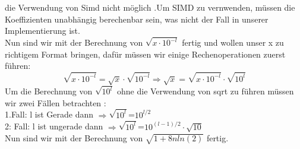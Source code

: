 \documentclass[course=erap]{aspdoc}
\begin{document}
die Verwendung von Simd  nicht möglich .Um SIMD zu vernwenden, müssen die Koeffizienten unabhängig berechenbar sein, was nicht der Fall in unserer Implementierung ist.
\\ Nun sind wir mit der Berechnung von $\sqrt{x\cdot 10^{-l}}$ fertig und wollen unser x
zu richtigem Format bringen, dafür müssen wir einige Rechenoperationen zuerst führen:
\begin{equation}\label{eq8}
    \sqrt{x\cdot 10^{-l}}  = \sqrt{x} \cdot \sqrt{10^{-l}}
    \Longrightarrow \sqrt{x}=\sqrt{x\cdot 10^{-l}}\cdot \sqrt{10^{l}}
\end{equation}
Um die Berechnung von $\sqrt{10^{l}}$ ohne die Verwendung von sqrt zu führen müssen wir zwei Fällen betrachten \cite{smallx}:
\\
1.Fall: l ist Gerade dann $\Longrightarrow \sqrt{10^{l}}$=$10^{l/2}$
\\
2: Fall: l ist ungerade dann $\Longrightarrow \sqrt{10^{l}}$=$10^{(l-1)/2} \cdot \sqrt{10}$
\\ Nun sind wir mit der Berechnung von $\sqrt{1+8nln(2)}$ fertig.
\end{document}
